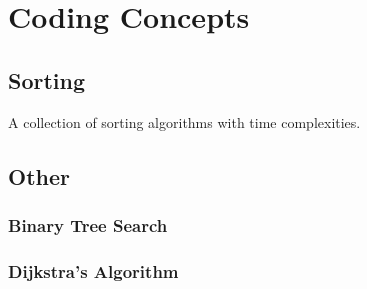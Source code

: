 \chapter{Coding Concepts}
\label{coding}

\section{Sorting}
\label{coding:sorts}

\begin{table}[H]
\centering
\begingroup
\renewcommand*{\arraystretch}{1}

\endgroup
\caption{
A collection of sorting algorithms with time complexities.
}
\label{tab:sorting_table}
\end{table}

\section{Other}
\label{coding:other}

\subsection{Binary Tree Search}
\label{coding:other:binary_tree_search}

\subsection{Dijkstra's Algorithm}
\label{coding:other:dijkstra}
